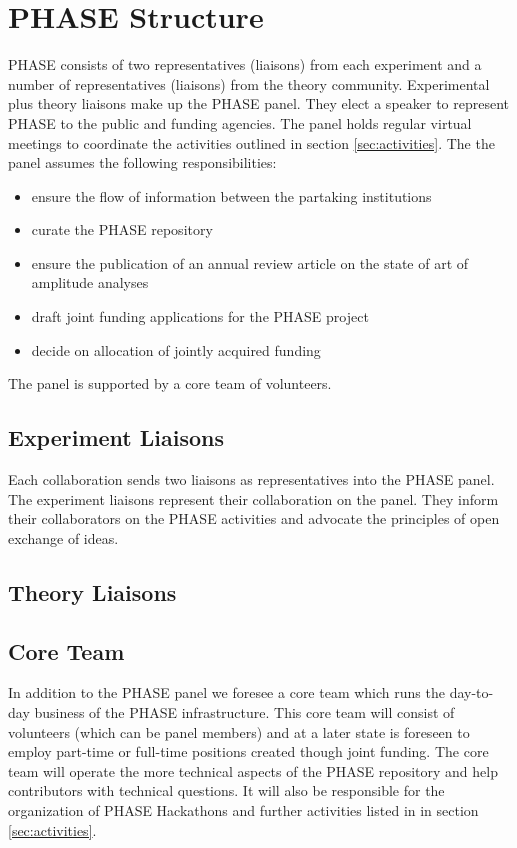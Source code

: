 \section{PHASE Structure}
\label{sec:structure}
PHASE consists of two representatives (liaisons) from each experiment and a number of representatives (liaisons) from the theory community. Experimental plus theory liaisons make up the PHASE panel. They elect a speaker to represent PHASE to the public and funding agencies. The panel holds regular virtual meetings to coordinate the activities outlined in section \ref{sec:activities}. The the panel assumes the following responsibilities:
\begin{itemize}
\item ensure the flow of information between the partaking institutions
\item curate the PHASE repository
\item ensure the publication of an annual review article on the state of art of amplitude analyses
\item draft joint funding applications for the PHASE project
\item decide on allocation of jointly acquired funding
\end{itemize}

The panel is supported by a core team of volunteers.

\subsection{Experiment Liaisons}
Each collaboration sends two liaisons as representatives into the PHASE panel. The experiment liaisons represent their collaboration on the panel. They inform their collaborators on the PHASE activities and advocate the principles of open exchange of ideas. 

\subsection{Theory Liaisons}



\subsection{Core Team}

In addition to the PHASE panel we foresee a core team which runs the day-to-day business of the PHASE infrastructure. This core team will consist of volunteers (which can be panel members) and at a later state is foreseen to employ part-time or full-time positions created though joint funding. The core team will operate the more technical aspects of the PHASE repository and help contributors with technical questions. It will also be responsible for the organization of PHASE Hackathons and further activities listed in in section \ref{sec:activities}.

